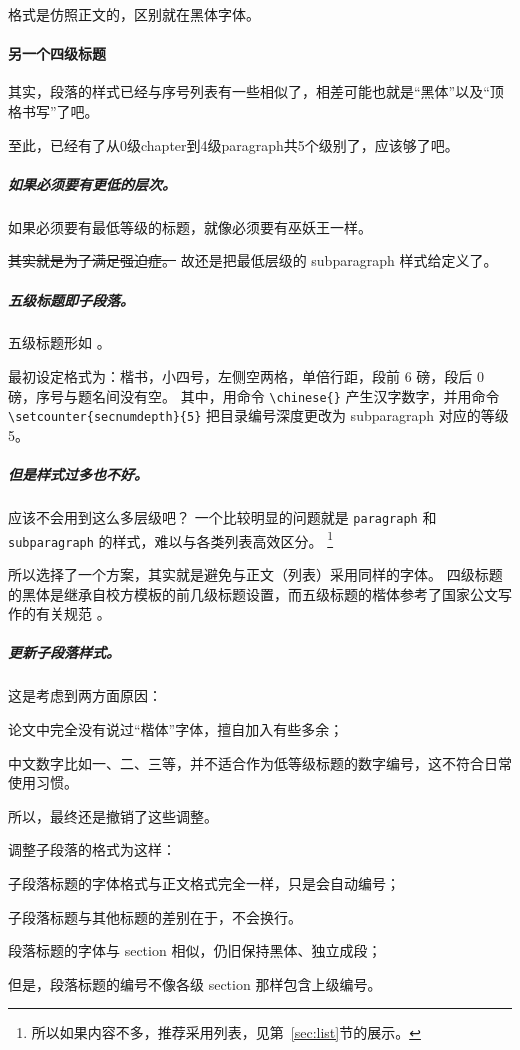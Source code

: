 \documentclass[../Main/thesis]{subfiles}
\begin{document}
格式是仿照正文的，区别就在黑体字体。

\paragraph{另一个四级标题} \label{spr:subpar}

其实，段落的样式已经与序号列表有一些相似了，相差可能也就是“黑体”以及“顶格书写”了吧。

至此，已经有了从0级chapter到4级paragraph共5个级别了，应该够了吧。

\subparagraph{如果必须要有更低的层次。}
如果必须要有最低等级的标题，就像必须要有巫妖王一样。

\sout{其实就是为了满足强迫症。}
故还是把最低层级的 subparagraph 样式给定义了。

\subparagraph{五级标题即子段落。}
五级标题形如 。

最初设定格式为：楷书，小四号，左侧空两格，单倍行距，段前 6 磅，段后 0 磅，序号与题名间没有空。
其中，用命令 \verb|\chinese{}| 产生汉字数字，并用命令 \verb|\setcounter{secnumdepth}{5}| 把目录编号深度更改为 subparagraph 对应的等级 5。

\subparagraph{但是样式过多也不好。}
应该不会用到这么多层级吧？
一个比较明显的问题就是 \verb|paragraph| 和 \verb|subparagraph| 的样式，难以与各类列表高效区分。
\footnote{所以如果内容不多，推荐采用列表，见第~\ref{sec:list}节的展示。}

所以选择了一个方案，其实就是避免与正文（列表）采用同样的字体。
四级标题的黑体是继承自校方模板的前几级标题设置，而五级标题的楷体参考了国家公文写作的有关规范 \cite{GBT9704}。

\subparagraph{更新子段落样式。}
这是考虑到两方面原因：
\begin{inlinecn}
  \item 论文中完全没有说过“楷体”字体，擅自加入有些多余；
  \item 中文数字比如一、二、三等，并不适合作为低等级标题的数字编号，这不符合日常使用习惯。
\end{inlinecn}
所以，最终还是撤销了这些调整。

调整子段落的格式为这样：
\begin{inline}
  \item 子段落标题的字体格式与正文格式完全一样，只是会自动编号；
  \item 子段落标题与其他标题的差别在于，不会换行。
  \item 段落标题的字体与 section 相似，仍旧保持黑体、独立成段；
  \item 但是，段落标题的编号不像各级 section 那样包含上级编号。
\end{inline}
\end{document}
